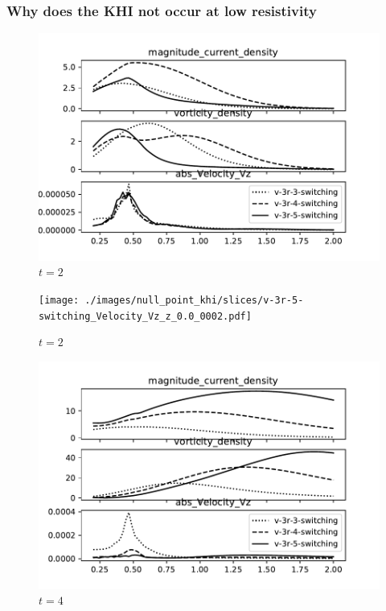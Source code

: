 \subsubsection{Why does the KHI not occur at low resistivity}

\begin{figure}[h]
  \centering
  \includegraphics[width=0.8\linewidth]{./images/null_point_khi/azimuthal_averages_v-3_2.pdf}
  \caption{$t=2$}%
  \label{fig:azimuthal_averages_v-3_2}
\end{figure}

\begin{figure}[H]
  \centering
  \texttt{[image: ./images/null\_point\_khi/slices/v-3r-5-switching\_Velocity\_Vz\_z\_0.0\_0002.pdf]}
  \caption{$t=2$}%
  \label{fig:v-3r-5-switching_Velocity_Vz_z_0_0002}
\end{figure}

\begin{figure}[h]
  \centering
  \includegraphics[width=0.8\linewidth]{./images/null_point_khi/azimuthal_averages_v-3_4.pdf}
  \caption{$t=4$}%
  \label{fig:azimuthal_averages_v-3_4}
\end{figure}

